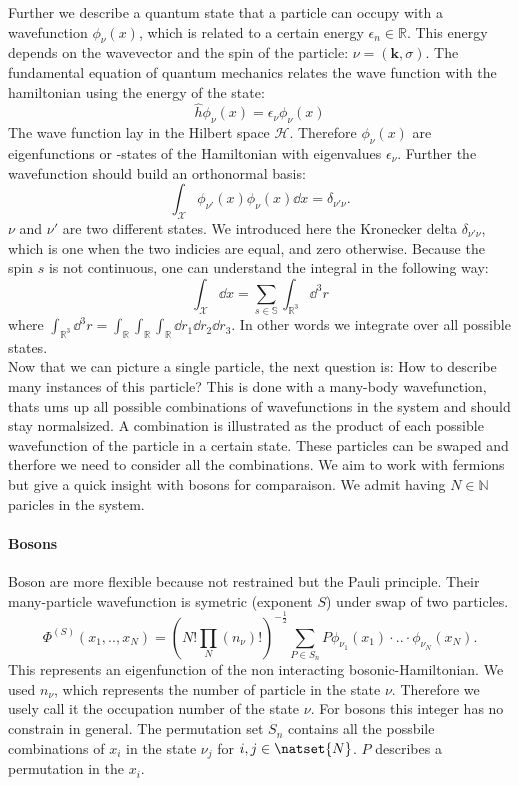\documentclass[../main.tex]{subfile}
\begin{document}
Further we describe a quantum state that a particle can occupy with a wavefunction $\phi_{\nu}(x)$, 
which is related to a certain energy $\epsilon_n \in\mathbb{R}$. This energy depends on 
the wavevector and the spin of the particle: $\nu = (\bm{k}, \sigma)$. The fundamental equation of
quantum mechanics relates the wave function with the hamiltonian using the energy of the state:
\[
    \hat{h} \phi_{\nu}(x) = \epsilon_\nu \phi_{\nu}(x)
\]
The wave function lay in the Hilbert space $\mathcal{H}$. Therefore $\phi_{\nu}(x)$ are eigenfunctions or -states of
the Hamiltonian with eigenvalues $\epsilon_{\nu}$. Further the wavefunction should build an orthonormal basis:
\[
    \int_\mathcal{X} \phi_{\nu'}(x) \phi_{\nu}(x) \dd x = \delta_{\nu'\nu}.
\]
$\nu$ and $\nu'$ are two different states. We introduced here the Kronecker delta $\delta_{\nu'\nu}$, which is one when the two indicies
are equal, and zero otherwise. Because the spin $s$ is not continuous, one can understand the integral in the following way:
\[
    \int_\mathcal{X} \dd x = \sum_{s\in \mathbb{S}} \int_{\mathbb{R}^3} \dd^3 r
\]  
where $ \int_{\mathbb{R}^3}\dd^3 r = \int_{\mathbb{R}}\int_{\mathbb{R}}\int_{\mathbb{R}} \dd r_1 \dd r_2 \dd r_3$.
In other words we integrate over all possible states.\\

Now that we can picture a single particle, the next question is: How to describe many instances of this particle?
This is done with a many-body wavefunction, thats ums up all possible combinations of wavefunctions in the system and should stay normalsized. 
A combination is illustrated as the product of each possible wavefunction of the particle in a certain state. These particles
can be swaped and therfore we need to consider all the combinations.
We aim to work with fermions but give a quick insight with bosons for comparaison. We admit having $N \in \mathbb{N}$ paricles in the system.\\

\paragraph{Bosons}
Boson are more flexible because not restrained but the Pauli principle.
Their many-particle wavefunction is symetric (exponent $S$) under swap of two particles.
\[
    \Phi^{(S)}(x_1,..,x_N) = \left(N!\prod_{N}(n_{\nu})!\right)^{-\frac{1}{2}} \sum_{P\in S_n} P \phi_{\nu_1}(x_1)\cdot ..\cdot \phi_{\nu_N}(x_N).
\]
This represents an eigenfunction of the non interacting bosonic-Hamiltonian.
We used $n_{\nu}$, which represents the number of particle in the state $\nu$. Therefore we usely call it the occupation number of the state $\nu$.
For bosons this integer has no constrain in general.
The permutation set $S_n$ contains all the possbile combinations of $x_i$ in the state $\nu_j$ for $i,j\in\natset{N}$. $P$ describes a permutation
in the $x_i$.\\
\end{document}
